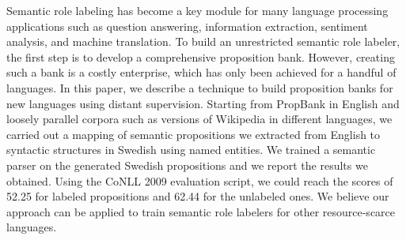 Semantic role labeling has become a key module for many language processing applications such as question answering, information extraction, sentiment analysis, and machine translation. To build an unrestricted semantic role labeler, the first step is to develop a comprehensive proposition bank. However, creating such a bank is a costly enterprise, which has only been achieved for a handful of languages. In this paper, we describe a technique to build proposition banks for new languages using distant supervision. Starting from PropBank in English and loosely parallel corpora such as versions of Wikipedia in different languages, we carried out a mapping of semantic propositions we extracted from English to syntactic structures in Swedish using named entities. We trained a semantic parser on the generated Swedish propositions and we report the results we obtained. Using the CoNLL 2009 evaluation script, we could reach the scores of 52.25 for labeled propositions and 62.44 for the unlabeled ones. We believe our approach can be applied to train semantic role labelers for other resource-scarce languages.
